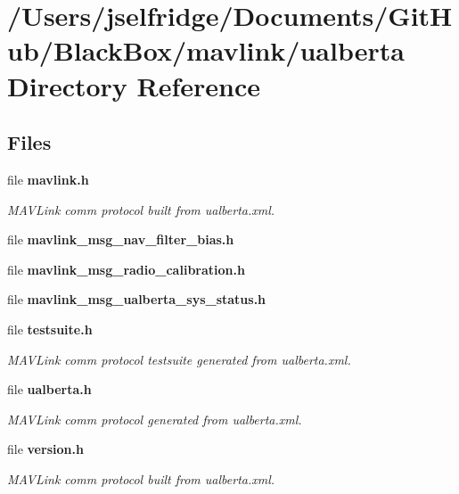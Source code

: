 \section{/\+Users/jselfridge/\+Documents/\+Git\+Hub/\+Black\+Box/mavlink/ualberta Directory Reference}
\label{dir_f372d3ea7cce3d7af9e4eab38d0f575e}
\subsection*{Files}
\begin{DoxyCompactItemize}
\item 
file \textbf{ mavlink.\+h}
\begin{DoxyCompactList}\small\item\em M\+A\+V\+Link comm protocol built from ualberta.\+xml. \end{DoxyCompactList}\item 
file \textbf{ mavlink\+\_\+msg\+\_\+nav\+\_\+filter\+\_\+bias.\+h}
\item 
file \textbf{ mavlink\+\_\+msg\+\_\+radio\+\_\+calibration.\+h}
\item 
file \textbf{ mavlink\+\_\+msg\+\_\+ualberta\+\_\+sys\+\_\+status.\+h}
\item 
file \textbf{ testsuite.\+h}
\begin{DoxyCompactList}\small\item\em M\+A\+V\+Link comm protocol testsuite generated from ualberta.\+xml. \end{DoxyCompactList}\item 
file \textbf{ ualberta.\+h}
\begin{DoxyCompactList}\small\item\em M\+A\+V\+Link comm protocol generated from ualberta.\+xml. \end{DoxyCompactList}\item 
file \textbf{ version.\+h}
\begin{DoxyCompactList}\small\item\em M\+A\+V\+Link comm protocol built from ualberta.\+xml. \end{DoxyCompactList}\end{DoxyCompactItemize}
